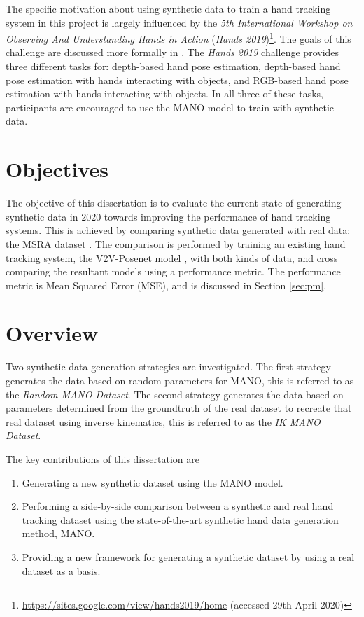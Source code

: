 The specific motivation about using synthetic data to train a hand tracking system in this project is largely influenced by the {\slshape 5th International Workshop on Observing And Understanding Hands in Action} ({\slshape Hands 2019})\footnote{\url{https://sites.google.com/view/hands2019/home} (accessed 29th April 2020)}. The goals of this challenge are discussed more formally in \cite{armagan2020measuring}. The {\slshape Hands 2019} challenge provides three different tasks for: depth-based hand pose estimation, depth-based hand pose estimation with hands interacting with objects, and RGB-based hand pose estimation with hands interacting with objects. In all three of these tasks, participants are encouraged to use the MANO model to train with synthetic data.

\section{Objectives}
The objective of this dissertation is to evaluate the current state of generating synthetic data in 2020 towards improving the performance of hand tracking systems. This is achieved by comparing synthetic data generated with real data: the MSRA dataset \cite{sun2015cascaded}. The comparison is performed by training an existing hand tracking system, the V2V-Posenet model \cite{moon2018v2v}, with both kinds of data, and cross comparing the resultant models using a performance metric. The performance metric is Mean Squared Error (MSE), and is discussed in Section \ref{sec:pm}.




\section{Overview}
Two synthetic data generation strategies are investigated. The first strategy generates the data based on random parameters for MANO, this is referred to as the {\slshape Random MANO Dataset}. The second strategy generates the data based on parameters determined from the groundtruth of the real dataset to recreate that real dataset using inverse kinematics, this is referred to as the {\slshape IK MANO Dataset}.

The key contributions of this dissertation are 
\begin{enumerate}
    \item Generating a new synthetic dataset using the MANO model.
    \item Performing a side-by-side comparison between a synthetic and real hand tracking dataset using the state-of-the-art synthetic hand data generation method, MANO.
    \item Providing a new framework for generating a synthetic dataset by using a real dataset as a basis.
\end{enumerate}

